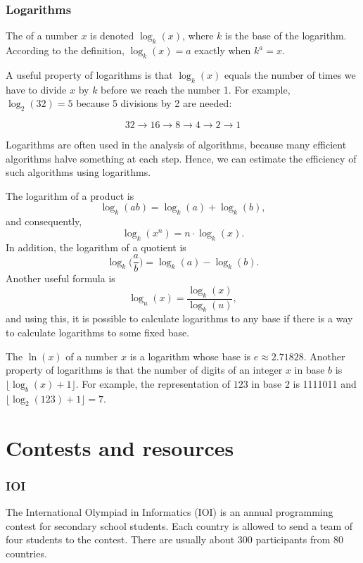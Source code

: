 \subsubsection{Logarithms}


The  of a number $x$
is denoted $\log_k(x)$, where $k$ is the base
of the logarithm.
According to the definition,
$\log_k(x)=a$ exactly when $k^a=x$.

A useful property of logarithms is
that $\log_k(x)$ equals the number of times
we have to divide $x$ by $k$ before we reach
the number 1.
For example, $\log_2(32)=5$
because 5 divisions by 2 are needed:

\[32 \rightarrow 16 \rightarrow 8 \rightarrow 4 \rightarrow 2 \rightarrow 1 \]

Logarithms are often used in the analysis of
algorithms, because many efficient algorithms
halve something at each step.
Hence, we can estimate the efficiency of such algorithms
using logarithms.

The logarithm of a product is
\[\log_k(ab) = \log_k(a)+\log_k(b),\]
and consequently,
\[\log_k(x^n) = n \cdot \log_k(x).\]
In addition, the logarithm of a quotient is
\[\log_k\Big(\frac{a}{b}\Big) = \log_k(a)-\log_k(b).\]
Another useful formula is
\[\log_u(x) = \frac{\log_k(x)}{\log_k(u)},\]
and using this, it is possible to calculate
logarithms to any base if there is a way to
calculate logarithms to some fixed base.


The  $\ln(x)$ of a number $x$
is a logarithm whose base is $e \approx 2.71828$.
Another property of logarithms is that
the number of digits of an integer $x$ in base $b$ is
$\lfloor \log_b(x)+1 \rfloor$.
For example, the representation of
$123$ in base $2$ is 1111011 and
$\lfloor \log_2(123)+1 \rfloor = 7$.

\section{Contests and resources}

\subsubsection{IOI}

The International Olympiad in Informatics (IOI)
is an annual programming contest for
secondary school students.
Each country is allowed to send a team of
four students to the contest.
There are usually about 300 participants
from 80 countries.

